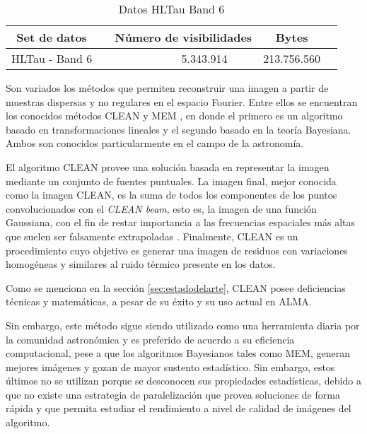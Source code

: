 \newcommand{\ra}[1]{\renewcommand{\arraystretch}{#1}}
\begin{table}[h!]
\centering
\ra{1.2}
\caption{Datos HLTau Band 6}
\label{tab:data}
\begin{tabular}{@{}rcrrcr@{}} 
\toprule
 \multicolumn{1}{c}{{\bf Set de datos}} & \phantom{a} & \multicolumn{2}{c}{{\bf Número de visibilidades}}  & \multicolumn{1}{c}{{\bf Bytes}} \\
 \midrule    
 HLTau - Band 6   && 5.343.914 &&  213.756.560\\
 \toprule
\end{tabular}
\end{table}


Son variados los métodos que permiten reconstruir una imagen a partir de muestras dispersas y no regulares en el espacio Fourier. Entre ellos se encuentran los conocidos métodos CLEAN \cite{CLEAN} y MEM \cite{MEM}, en donde el primero es un algoritmo basado en transformaciones lineales y el segundo basado en la teoría Bayesiana. Ambos son conocidos particularmente en el campo de la astronomía.


El algoritmo CLEAN provee una solución basada en representar la imagen mediante un conjunto de fuentes puntuales. La imagen final, mejor conocida como la imagen CLEAN, es la suma de todos los componentes de los puntos convolucionados con el \textit{CLEAN beam}, esto es, la imagen de una función Gaussiana, con el fin de restar importancia a las frecuencias espaciales más altas que suelen ser falsamente extrapoladas \cite{libroAstro2}. Finalmente, CLEAN es un procedimiento cuyo objetivo es generar una imagen de residuos con variaciones homogéneas y similares al ruido térmico presente en los datos. 

Como se menciona en la sección \ref{sec:estadodelarte}, CLEAN posee deficiencias técnicas y matemáticas, a pesar de su éxito y su uso actual en ALMA.

Sin embargo, este método sigue siendo utilizado como una herramienta diaria por la comunidad astronómica y es preferido de acuerdo a su eficiencia computacional, pese a que los algoritmos Bayesianos tales como MEM, generan mejores imágenes y gozan de mayor sustento estadístico. Sin embargo, estos últimos no se utilizan porque se desconocen sus propiedades estadísticas, debido a que no existe una estrategia de paralelización que provea soluciones de forma rápida y que permita estudiar el rendimiento a nivel de calidad de imágenes del algoritmo.

